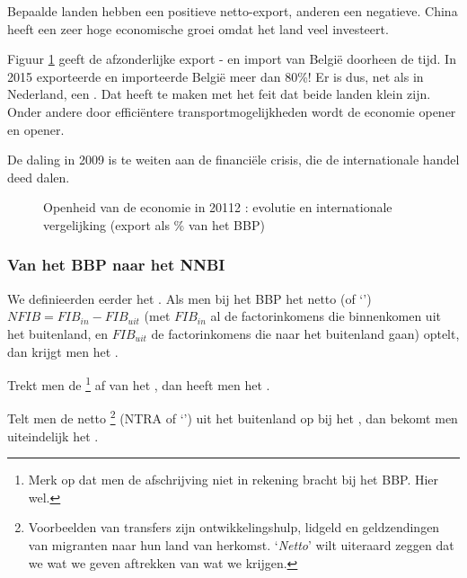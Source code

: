 Bepaalde landen hebben een positieve netto-export, anderen een negatieve. China heeft een zeer hoge economische groei omdat het land veel investeert.\\

\par Figuur \ref{fig:h5opecon} geeft de afzonderlijke export - en import van Belgi\"e doorheen de tijd. In 2015 exporteerde en importeerde Belgi\"e meer dan 80\%! Er is dus, net als in Nederland, een . Dat heeft te maken met het feit dat beide landen klein zijn. Onder andere door effici\"entere transportmogelijkheden wordt de economie opener en opener.
\par De daling in 2009 is te weiten aan de financi\"ele crisis, die de internationale handel deed dalen.

\begin{figure}[H]
\small\centering\captionsetup{justification=centering,margin=2cm}
\caption{Openheid van de economie in 20112 : evolutie en internationale vergelijking (export als \% van het BBP)}
\label{fig:h5opecon}
\end{figure}

\subsubsection{Van het BBP naar het NNBI}

We definieerden eerder het . Als men bij het BBP het netto  (of `') $NFIB=FIB_{in}-FIB_{uit}$ (met $FIB_{in}$ al de factorinkomens die binnenkomen uit het buitenland, en $FIB_{uit}$ de factorinkomens die naar het buitenland gaan) optelt, dan krijgt men het .
\par Trekt men de \footnote{Merk op dat men de afschrijving niet in rekening bracht bij het BBP. Hier wel.} af van het , dan heeft men het .
\par Telt men de netto \footnote{Voorbeelden van transfers zijn ontwikkelingshulp, lidgeld en geldzendingen van migranten naar hun land van herkomst. `\textit{Netto}' wilt uiteraard zeggen dat we wat we geven aftrekken van wat we krijgen.} (NTRA of `') uit het buitenland op bij het , dan bekomt men uiteindelijk het .\\

